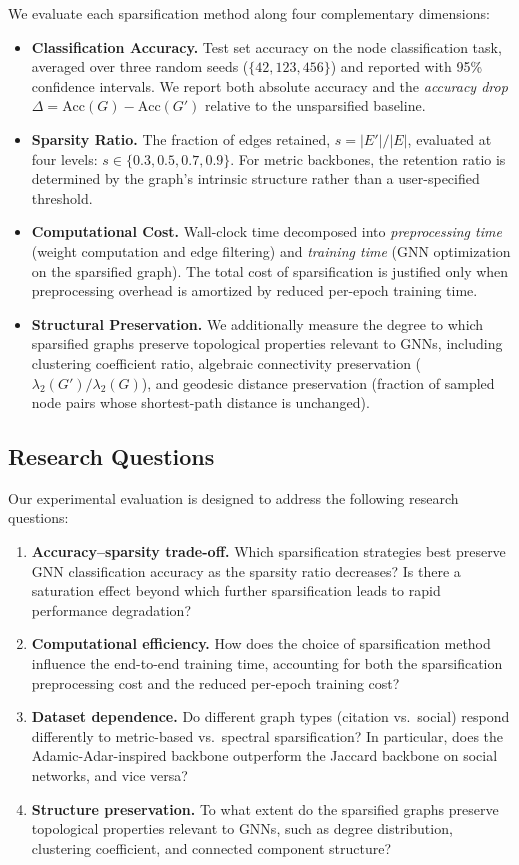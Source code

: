 \documentclass[conference]{IEEEtran}
\begin{document}
We evaluate each sparsification method along four complementary dimensions:
\begin{itemize}
    \item \textbf{Classification Accuracy.} Test set accuracy on the node classification task, averaged over three random seeds ($\{42, 123, 456\}$) and reported with 95\% confidence intervals. We report both absolute accuracy and the \emph{accuracy drop} $\Delta = \text{Acc}(G) - \text{Acc}(G')$ relative to the unsparsified baseline.
    \item \textbf{Sparsity Ratio.} The fraction of edges retained, $s = |E'| / |E|$, evaluated at four levels: $s \in \{0.3, 0.5, 0.7, 0.9\}$. For metric backbones, the retention ratio is determined by the graph's intrinsic structure rather than a user-specified threshold.
    \item \textbf{Computational Cost.} Wall-clock time decomposed into \emph{preprocessing time} (weight computation and edge filtering) and \emph{training time} (GNN optimization on the sparsified graph). The total cost of sparsification is justified only when preprocessing overhead is amortized by reduced per-epoch training time.
    \item \textbf{Structural Preservation.} We additionally measure the degree to which sparsified graphs preserve topological properties relevant to GNNs, including clustering coefficient ratio, algebraic connectivity preservation ($\lambda_2(G') / \lambda_2(G)$), and geodesic distance preservation (fraction of sampled node pairs whose shortest-path distance is unchanged).
\end{itemize}

\subsection{Research Questions}

Our experimental evaluation is designed to address the following research questions:

\begin{enumerate}
    \item \textbf{Accuracy--sparsity trade-off.} Which sparsification strategies best preserve GNN classification accuracy as the sparsity ratio decreases? Is there a saturation effect beyond which further sparsification leads to rapid performance degradation?
    \item \textbf{Computational efficiency.} How does the choice of sparsification method influence the end-to-end training time, accounting for both the sparsification preprocessing cost and the reduced per-epoch training cost?
    \item \textbf{Dataset dependence.} Do different graph types (citation vs.\ social) respond differently to metric-based vs.\ spectral sparsification? In particular, does the Adamic-Adar-inspired backbone outperform the Jaccard backbone on social networks, and vice versa?
    \item \textbf{Structure preservation.} To what extent do the sparsified graphs preserve topological properties relevant to GNNs, such as degree distribution, clustering coefficient, and connected component structure?
\end{enumerate}
\end{document}
